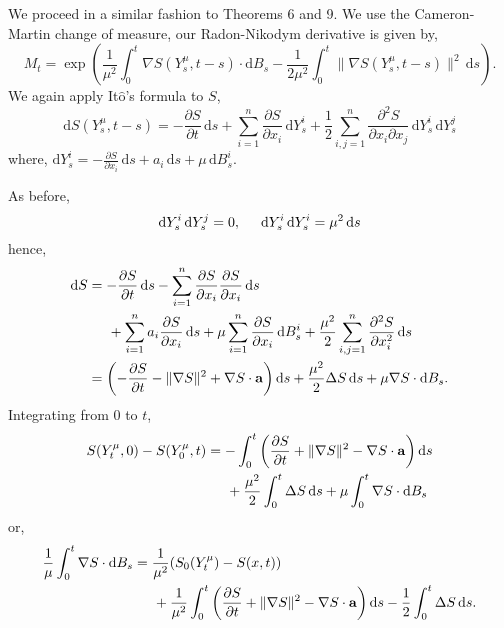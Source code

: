 \documentclass[a4paper,12pt,draft]{report}
\theoremstyle{remark}
\theoremstyle{definition}
\begin{document}
{
We proceed in a similar fashion to Theorems 6 and 9.  We use the Cameron-Martin change of measure, our Radon-Nikodym derivative is given by,
$$
M_t = \exp\left(\frac{1}{\mu^2}\int_0^t\nabla S(Y_s^\mu, t - s)\cdot\mathrm{d}B_s - \frac{1}{2\mu^2}\int_0^t\|\nabla S(Y_s^\mu, t - s)\|^2\,\mathrm{d}s\right).
$$
We again apply It$\mathrm{\hat{o}}$'s formula to $S$,
$$
\mathrm{d}S(Y_s^\mu, t -s) = -\frac{\partial S}{\partial t}\,\mathrm{d}s + \sum_{i = 1}^n\frac{\partial S}{\partial x_i}\,\mathrm{d}Y_s^i + \frac{1}{2}\sum_{i, j = 1}^n\frac{\partial^2 S}{\partial x_i \partial x_j}\,\mathrm{d}Y_s^i\,\mathrm{d}Y_s^j
$$
where, $\mathrm{d}Y_s^i = -\frac{\partial S}{\partial x_i}\,\mathrm{d}s + a_i\,\mathrm{d}s + \mu\,\mathrm{d}B_s^i$.

As before,
$$
\mathrm{d}Y_s^i\,\mathrm{d}Y_s^j = 0, \hspace{0.5cm} \mathrm{d}Y_s^i\,\mathrm{d}Y_s^i = \mu^2\,\mathrm{d}s
$$
hence,
\begin{align}
\mathrm{d}S & = -\frac{\partial S}{\partial t}\,\mathrm{d}s - \sum_{i = 1}^n\frac{\partial S}{\partial x_i}\frac{\partial S}{\partial x_i}\,\mathrm{d}s\nonumber\\
& \hspace{0.5cm} + \sum_{i = 1}^na_i\frac{\partial S}{\partial x_i}\,\mathrm{d}s + \mu\sum_{i = 1}^n\frac{\partial S}{\partial x_i}\,\mathrm{d}B_s^i + \frac{\mu^2}{2}\sum_{i, j = 1}^n\frac{\partial^2 S}{\partial x_i^2}\,\mathrm{d}s\nonumber\\
& = \left(-\frac{\partial S}{\partial t} - \|\nabla S\|^2 + \nabla S\cdot\bold{a}\right)\mathrm{d}s + \frac{\mu^2}{2}\Delta S\,\mathrm{d}s + \mu\nabla S\cdot\mathrm{d}B_s.\nonumber
\end{align}
Integrating from $0$ to $t$,
\begin{align}
S(Y_t^\mu, 0) - S(Y_0^\mu, t) & = -\int_0^t\left(\frac{\partial S}{\partial t} + \|\nabla S\|^2 - \nabla S\cdot\bold{a}\right)\mathrm{d}s\nonumber\\
& \hspace{0.5cm} + \frac{\mu^2}{2}\int_0^t\Delta S\,\mathrm{d}s + \mu\int_0^t\nabla S\cdot\mathrm{d}B_s\nonumber
\end{align}
or,
\begin{align}
\frac{1}{\mu}\int_0^t\nabla S\cdot\mathrm{d}B_s & = \frac{1}{\mu^2}(S_0(Y_t^\mu) - S(x, t))\nonumber\\
& \hspace{0.5cm} + \frac{1}{\mu^2}\int_0^t\left(\frac{\partial S}{\partial t} + \|\nabla S\|^2 - \nabla S\cdot\bold{a}\right)\mathrm{d}s - \frac{1}{2}\int_0^t\Delta S\,\mathrm{d}s.\nonumber

\end{align}}
\end{document}
